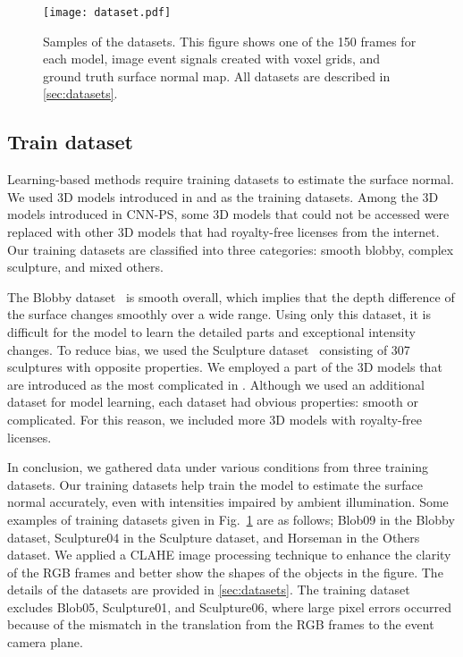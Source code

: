 \begin{figure}[t]
    \centering
    \texttt{[image: dataset.pdf]}
    \caption{Samples of the datasets. This figure shows one of the 150 frames for each model, image event signals created with voxel grids, and ground truth surface normal map. All datasets are described in \ref{sec:datasets}.}
    \label{fig:dataset}
\end{figure}
\subsection{Train dataset}
Learning-based methods require training datasets to estimate the surface normal. We used 3D models introduced in \citep{chen2018ps} and \citep{ikehata2018cnn} as the training datasets. Among the 3D models introduced in CNN-PS, some 3D models that could not be accessed were replaced with other 3D models that had royalty-free licenses from the internet. Our training datasets are classified into three categories: smooth blobby, complex sculpture, and mixed others.

The Blobby dataset~\citep{johnson2011shape} is smooth overall, which implies that the depth difference of the surface changes smoothly over a wide range. Using only this dataset, it is difficult for the model to learn the detailed parts and exceptional intensity changes. To reduce bias, we used the Sculpture dataset~\citep{zisserman2017silnet} consisting of 307 sculptures with opposite properties. We employed a part of the 3D models that are introduced as the most complicated in \citep{chen2018ps}. Although we used an additional dataset for model learning, each dataset had obvious properties: smooth or complicated. For this reason, we included more 3D models with royalty-free licenses.

In conclusion, we gathered data under various conditions from three training datasets. Our training datasets help train the model to estimate the surface normal accurately, even with intensities impaired by ambient illumination. Some examples of training datasets given in Fig.~\ref{fig:dataset} are as follows; Blob09 in the Blobby dataset, Sculpture04 in the Sculpture dataset, and Horseman in the Others dataset. We applied a CLAHE image processing technique to enhance the clarity of the RGB frames and better show the shapes of the objects in the figure. The details of the datasets are provided in \ref{sec:datasets}. The training dataset excludes Blob05, Sculpture01, and Sculpture06, where large pixel errors occurred because of the mismatch in the translation from the RGB frames to the event camera plane.

